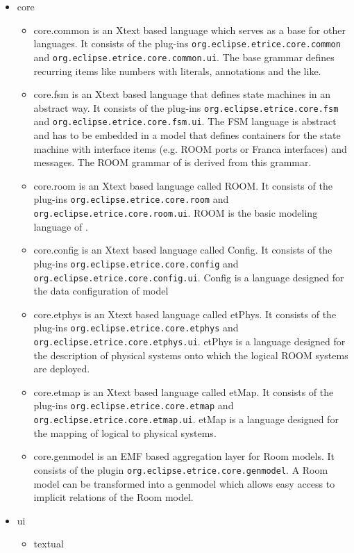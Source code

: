\begin{itemize}
\item core

\begin{itemize}
\item core.common is an Xtext based language which serves as a base for other \eTrice{} languages.
It consists of the plug-ins
\texttt{org.eclipse.etrice.core.common} and
\texttt{org.eclipse.etrice.core.common.ui}.
The base grammar defines recurring items like numbers with literals, annotations and the like.
\item core.fsm is an Xtext based language that defines state machines in an abstract way.
It consists of the plug-ins
\texttt{org.eclipse.etrice.core.fsm} and
\texttt{org.eclipse.etrice.core.fsm.ui}.
The FSM language is abstract and has to be embedded in a model that defines containers for the state machine
with interface items (e.g. ROOM ports or Franca interfaces) and messages.
The ROOM grammar of \eTrice{} is derived from this grammar.
\item core.room is an Xtext based language called ROOM. It consists of the plug-ins
\texttt{org.eclipse.etrice.core.room} and
\texttt{org.eclipse.etrice.core.room.ui}. ROOM is the basic modeling language of \eTrice{}.
\item core.config is an Xtext based language called Config. It consists of the plug-ins
\texttt{org.eclipse.etrice.core.config} and
\texttt{org.eclipse.etrice.core.config.ui}. Config is a language designed for the data configuration of model 
\item core.etphys is an Xtext based language called etPhys. It consists of the plug-ins
\texttt{org.eclipse.etrice.core.etphys} and
\texttt{org.eclipse.etrice.core.etphys.ui}. etPhys is a language designed for the description of physical systems
onto which the logical ROOM systems are deployed.
\item core.etmap is an Xtext based language called etMap. It consists of the plug-ins
\texttt{org.eclipse.etrice.core.etmap} and
\texttt{org.eclipse.etrice.core.etmap.ui}. etMap is a language designed for the mapping of logical
to physical systems.
\item core.genmodel is an EMF based aggregation layer for Room models. It consists of the plugin 
\texttt{org.eclipse.etrice.core.genmodel}. A Room model can be transformed into a genmodel which allows 
easy access to implicit relations of the Room model.
\end{itemize}

\item ui
\begin{itemize}
\item textual
\begin{itemize}


\end{itemize}
\end{itemize}
\end{itemize}

